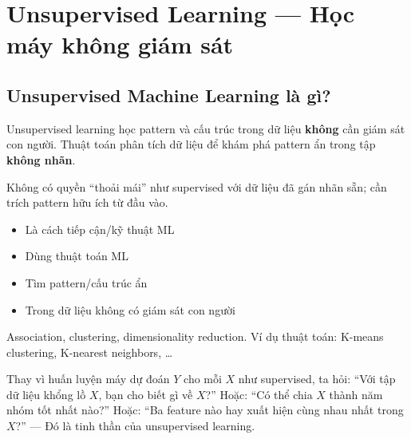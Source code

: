 \section{Unsupervised Learning --- Học máy không giám sát}
\label{sec:unsupervised-learning}

\subsection{Unsupervised Machine Learning là gì?}

\begin{dinhnghia}[title={Học không giám sát}]
Unsupervised learning học pattern và cấu trúc trong dữ liệu \textbf{không} cần giám sát con người.
Thuật toán phân tích dữ liệu để khám phá pattern ẩn trong tập \textbf{không nhãn}.
\end{dinhnghia}

\begin{vidu}[title={Minh hoạ unsupervised learning}]
\end{vidu}

\begin{ynghia}[title={Khác supervised}]
Không có quyền ``thoải mái'' như supervised với dữ liệu đã gán nhãn sẵn; cần trích pattern hữu ích từ đầu vào.
\end{ynghia}

\begin{vidu}[title={Tóm tắt một câu}]
\begin{itemize}
  \item Là cách tiếp cận/kỹ thuật ML
  \item Dùng thuật toán ML
  \item Tìm pattern/cấu trúc ẩn
  \item Trong dữ liệu không có giám sát con người
\end{itemize}
\end{vidu}

\begin{phuongphap}[title={Một số hướng và ví dụ}]
Association, clustering, dimensionality reduction.
Ví dụ thuật toán: K-means clustering, K-nearest neighbors, \ldots
\end{phuongphap}

\begin{vidu}[title={Ví dụ trực giác: dữ liệu cử tri}]
Thay vì huấn luyện máy dự đoán $Y$ cho mỗi $X$ như supervised, ta hỏi:
``Với tập dữ liệu khổng lồ $X$, bạn cho biết gì về $X$?''
Hoặc: ``Có thể chia $X$ thành năm nhóm tốt nhất nào?''
Hoặc: ``Ba feature nào hay xuất hiện cùng nhau nhất trong $X$?''
--- Đó là tinh thần của unsupervised learning.
\end{vidu}

